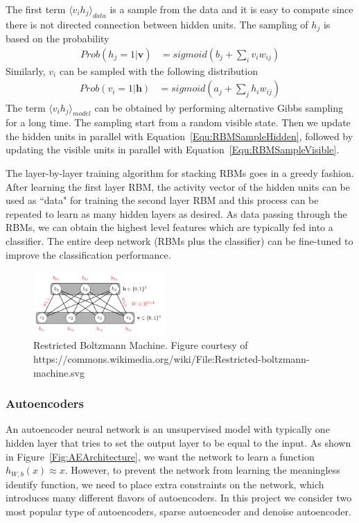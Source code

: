The first term $\langle v_i h_j \rangle_{data}$ is a sample from the data and it is easy to
compute since there is not directed connection between hidden units.
The sampling of $h_j$ is based on the probability
\begin{align}
    Prob(h_j = 1 | \mathbf{v}) &= sigmoid(b_j + \sum_i{v_i w_{ij}})
    \label{Equ:RBMSampleHidden}
\end{align}
Similarly, $v_i$ can be sampled with the following distribution
\begin{align}
    Prob(v_i = 1 | \mathbf{h}) &= sigmoid(a_j + \sum_j{h_i w_{ij}})
    \label{Equ:RBMSampleVisible}
\end{align}
The term $\langle v_i h_j \rangle_{model}$ can be obtained by performing alternative Gibbs
sampling for a long time.
The sampling start from a random visible state.
Then we update the hidden units in parallel with Equation~\ref{Equ:RBMSampleHidden},
followed by updating the visible units in parallel with Equation~\ref{Equ:RBMSampleVisible}.

The layer-by-layer training algorithm for stacking RBMs goes in a greedy fashion.
After learning the first layer RBM, the activity vector of the hidden units can be used
as ``data" for training the second layer RBM
and this process can be repeated to learn as many hidden layers as desired.
As data passing through the RBMs, we can obtain the highest level features 
which are typically fed into a classifier.
The entire deep network (RBMs plus the classifier) can be fine-tuned to
improve the classification performance.


\begin{figure}[h]
    \centering
    \includegraphics[width=0.45\textwidth]{figures/rbm.png}
    \caption{Restricted Boltzmann Machine.
        Figure courtesy of https://commons.wikimedia.org/wiki/File:Restricted-boltzmann-machine.svg}
    \label{Fig:RBMArchitecture}
\end{figure}



\subsubsection{Autoencoders}
An autoencoder neural network is an unsupervised model with typically one hidden layer that
tries to set the output layer to be equal to the input.
As shown in Figure~\ref{Fig:AEArchitecture}, we want the network to
learn a function $h_{W, b}(x) \approx x$.
However, to prevent the network from learning the meaningless identify function,
we need to place extra constraints on the network, which introduces many different
flavors of autoencoders.
In this project we consider two most popular type of autoencoders, sparse autoencoder and
denoise autoencoder.

